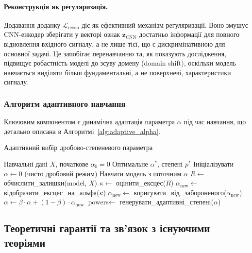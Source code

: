 \documentclass[12pt,a4paper]{article}
\begin{document}
\paragraph{Реконструкція як регуляризація.} Додавання доданку $\mathcal{L}_{\text{recon}}$ діє як ефективний механізм регуляризації. Воно змушує CNN-енкодер зберігати у векторі ознак $\mathbf{z}_{\text{CNN}}$ достатньо інформації для повного відновлення вхідного сигналу, а не лише тієї, що є дискримінативною для основної задачі. Це запобігає перенавчанню та, як показують дослідження, підвищує робастність моделі до зсуву домену (domain shift), оскільки модель навчається виділяти більш фундаментальні, а не поверхневі, характеристики сигналу.

\subsubsection{Алгоритм адаптивного навчання}

Ключовим компонентом є динамічна адаптація параметра $\alpha$ під час навчання, що детально описана в Алгоритмі~\ref{alg:adaptive_alpha}.

\begin{algorithm}[htbp]
	\caption{Адаптивний вибір дробово-степеневого параметра}
	\label{alg:adaptive_alpha}
	\begin{algorithmic}[1]
		\REQUIRE Навчальні дані $X$, початкове $\alpha_0 = 0$
		\ENSURE Оптимальне $\alpha^*$, степені $p^*$
		\STATE Ініціалізувати $\alpha \leftarrow 0$ (чисто дробовий режим)
		\STATE Навчати модель з поточним $\alpha$
		\STATE $R \leftarrow$ обчислити\_залишки($\text{model}$, $X$)
		\STATE $\kappa \leftarrow$ оцінити\_ексцес($R$)
		\STATE $\alpha_{\text{new}} \leftarrow$ відобразити\_ексцес\_на\_альфа($\kappa$)
		\STATE $\alpha_{\text{new}} \leftarrow$ коригувати\_від\_забороненого($\alpha_{\text{new}}$) 
		\STATE $\alpha \leftarrow \beta \cdot \alpha + (1-\beta) \cdot \alpha_{\text{new}}$ 
		\STATE $\text{powers} \leftarrow$ генерувати\_адаптивні\_степені($\alpha$)
		\ENDIF
		\ENDFOR
	\end{algorithmic}
\end{algorithm}

\subsection{Теоретичні гарантії та зв'язок з існуючими теоріями}
\end{document}
